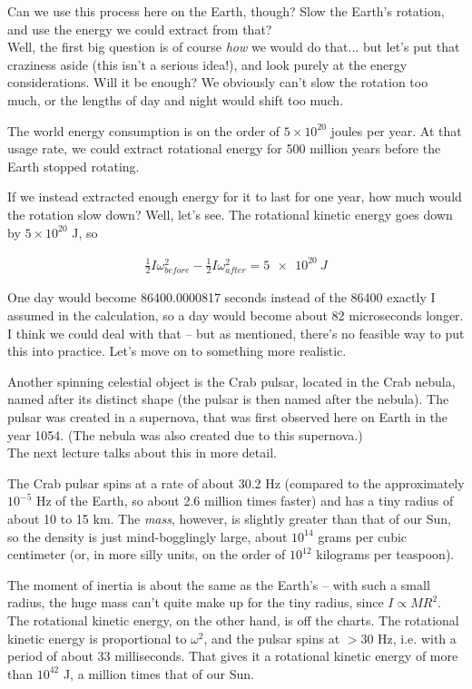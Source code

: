 Can we use this process here on the Earth, though? Slow the Earth's rotation, and use the energy we could extract from that?\\
Well, the first big question is of course \emph{how} we would do that... but let's put that craziness aside (this isn't a serious idea!), and look purely at the energy considerations. Will it be enough? We obviously can't slow the rotation too much, or the lengths of day and night would shift too much.

The world energy consumption is on the order of $5 \times 10^{20}$ joules per year. At that usage rate, we could extract rotational energy for 500 million years before the Earth stopped rotating.

If we instead extracted enough energy for it to last for one year, how much would the rotation slow down? Well, let's see. The rotational kinetic energy goes down by $5 \times 10^{20}$ J, so

\begin{align}
\frac{1}{2} I \omega_{before}^2 - \frac{1}{2} I \omega_{after}^2 = \SI{5e20}{J}
\end{align}

One day would become 86400.0000817 seconds instead of the 86400 exactly I assumed in the calculation, so a day would become about 82 microseconds longer. I think we could deal with that -- but as mentioned, there's no feasible way to put this into practice. Let's move on to something more realistic.

Another spinning celestial object is the Crab pulsar, located in the Crab nebula, named after its distinct shape (the pulsar is then named after the nebula). The pulsar was created in a supernova, that was first observed here on Earth in the year 1054. (The nebula was also created due to this supernova.)\\
The next lecture talks about this in more detail.

The Crab pulsar spins at a rate of about 30.2 Hz (compared to the approximately $10^{-5}$ Hz of the Earth, so about 2.6 million times faster) and has a tiny radius of about 10 to 15 km. The \emph{mass}, however, is slightly greater than that of our Sun, so the density is just mind-bogglingly large, about $10^{14}$ grams per cubic centimeter (or, in more silly units, on the order of $10^{12}$ kilograms per teaspoon).

The moment of inertia is about the same as the Earth's -- with such a small radius, the huge mass can't quite make up for the tiny radius, since $I \propto M R^2$.\\
The rotational kinetic energy, on the other hand, is off the charts. The rotational kinetic energy is proportional to $\omega^2$, and the pulsar spins at $>30$ Hz, i.e. with a period of about 33 milliseconds. That gives it a rotational kinetic energy of more than $10^{42}$ J, a million times that of our Sun.


